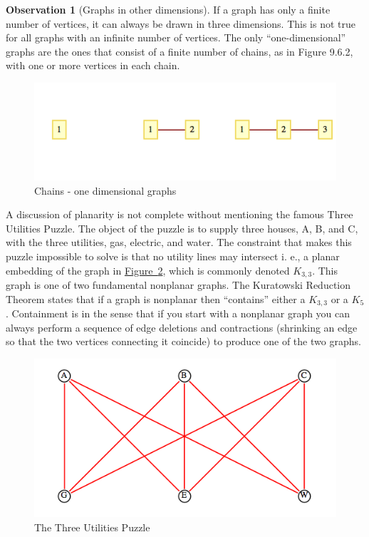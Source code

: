 \documentclass[10pt,]{book}
\theoremstyle{plain}
\theoremstyle{definition}
\theoremstyle{definition}
\newtheorem{observation}[theorem]{Observation}
\theoremstyle{definition}
\theoremstyle{definition}
\theoremstyle{definition}
\numberwithin{equation}{section}
\begin{document}
%
\begin{observation}[Graphs in other dimensions]\label{observation-2}
 If a graph has only a finite number of vertices, it can always be drawn in three dimensions. This is not true for all graphs with
an infinite number of vertices. The only ``one-dimensional'' graphs are the ones that consist of a finite number of chains, as in Figure 9.6.2,
with one or more vertices in each chain.%
\leavevmode%
\begin{figure}
\centering
\includegraphics[width=1\linewidth]{images/fig-chains.png}
\caption{Chains - one dimensional graphs
                \label{fig-chains}}
\end{figure}
\end{observation}
\par
{}A discussion of planarity is not complete without mentioning the famous Three Utilities Puzzle. The object
of the puzzle is to supply three houses, A, B, and C, with the three utilities, gas, electric, and water. The constraint that makes this puzzle impossible
to solve is that no utility lines may intersect i. e., a planar embedding of the graph in \hyperref[fig-utilities-puzzle]{Figure~\ref{fig-utilities-puzzle}}, which is commonly denoted \(K_{3,3}\). This graph is one of two fundamental nonplanar graphs. The Kuratowski Reduction Theorem states that if a graph is nonplanar then ``contains'' either a \(K_{3,3}\) or a \(K_5\).  Containment is in the sense that if you start with a nonplanar graph you can always perform a sequence of
edge deletions and contractions (shrinking an edge so that the two vertices connecting it coincide) to produce one of the two graphs.%
\leavevmode%
\begin{figure}
\centering
\includegraphics[width=1\linewidth]{images/fig-utilities-puzzle.png}
\caption{The Three Utilities Puzzle
                \label{fig-utilities-puzzle}}
\end{figure}
\end{document}
